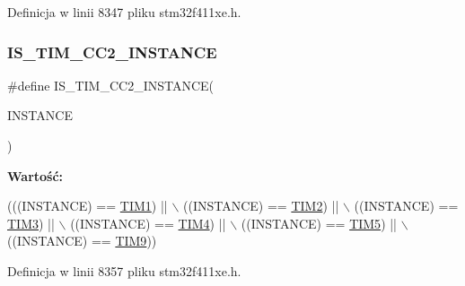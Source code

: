 Definicja w linii 8347 pliku stm32f411xe.\+h.

\mbox{\label{group___exported__macros_ga6ef84d278cf917c7e420b94687b39c7c}} 
\subsubsection{\texorpdfstring{I\+S\+\_\+\+T\+I\+M\+\_\+\+C\+C2\+\_\+\+I\+N\+S\+T\+A\+N\+CE}{IS\_TIM\_CC2\_INSTANCE}}
{\footnotesize\ttfamily \#define I\+S\+\_\+\+T\+I\+M\+\_\+\+C\+C2\+\_\+\+I\+N\+S\+T\+A\+N\+CE(\begin{DoxyParamCaption}\item[{}]{I\+N\+S\+T\+A\+N\+CE }\end{DoxyParamCaption})}

{\bfseries Wartość\+:}
\begin{DoxyCode}
(((INSTANCE) == \hyperlink{group___peripheral__declaration_ga2e87451fea8dc9380056d3cfc5ed81fb}{TIM1}) || \(\backslash\)
                                       ((INSTANCE) == \hyperlink{group___peripheral__declaration_ga3cfac9f2e43673f790f8668d48b4b92b}{TIM2}) || \(\backslash\)
                                       ((INSTANCE) == \hyperlink{group___peripheral__declaration_ga61ee4c391385607d7af432b63905fcc9}{TIM3}) || \(\backslash\)
                                       ((INSTANCE) == \hyperlink{group___peripheral__declaration_ga91a09bad8bdc7a1cb3d85cf49c94c8ec}{TIM4}) || \(\backslash\)
                                       ((INSTANCE) == \hyperlink{group___peripheral__declaration_ga5125ff6a23a2ed66e2e19bd196128c14}{TIM5}) || \(\backslash\)
                                       ((INSTANCE) == \hyperlink{group___peripheral__declaration_gaf52b4b4c36110a0addfa98059f54a50e}{TIM9}))
\end{DoxyCode}


Definicja w linii 8357 pliku stm32f411xe.\+h.

\mbox{\label{group___exported__macros_ga0c37cb8f925fd43622cce7a4c00fd95e}} 
